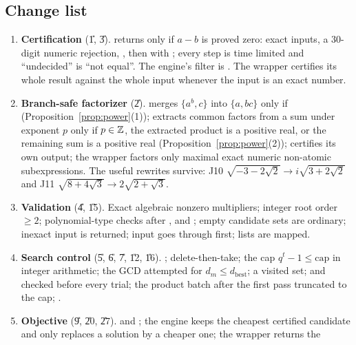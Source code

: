 \subsection{Change list}
\begin{enumerate}[label=\arabic*.]
\item \textbf{Certification} (\U{1}, \U{3}). 
      returns  only if $a-b$ is proved zero: exact inputs, a
      30-digit numeric rejection, , then
       with ; every step
      is time limited and ``undecided'' is ``not equal''. The engine's filter
      is . The
      wrapper certifies its whole result against the whole input whenever the
      input is an exact number.
\item \textbf{Branch-safe factorizer} (\U{2}).  merges
      $\{a^b,c\}$ into $\{a,bc\}$ only if 
      (Proposition~\ref{prop:power}(1));  extracts common factors
      from a sum under exponent $p$ only if $p\in\mathbb{Z}$, the extracted product is
      a positive real, or the remaining sum is a positive real
      (Proposition~\ref{prop:power}(2));  certifies its own
      output; the wrapper factors only maximal exact numeric non-atomic
      subexpressions. The useful rewrites survive: J10
      $\sqrt{-3-2\sqrt2}\to i\sqrt{3+2\sqrt2}$ and J11 $\sqrt{8+4\sqrt3}\to2\sqrt{2+\sqrt3}$.
\item \textbf{Validation} (\U{4}, \U{15}). Exact algebraic nonzero multipliers;
      integer root order $\ge2$; polynomial-type checks after
      ,  and ; empty
      candidate sets are ordinary; inexact input is returned; 
      input goes through  first; lists are mapped.
\item \textbf{Search control} (\U{5}, \U{6}, \U{7}, \U{12}, \U{16}).
      ; delete-then-take; the cap
      $q^t-1\le\text{cap}$ in integer arithmetic; the GCD attempted for
      $d_m\le d_{\text{best}}$; a visited set;  and
       checked before every trial; the product batch after
      the first pass truncated to the cap; .
\item \textbf{Objective} (\U{9}, \U{20}, \U{27}).  and
      ; the engine keeps the cheapest certified candidate and
      only replaces a solution by a cheaper one; the wrapper returns the

\end{enumerate}
